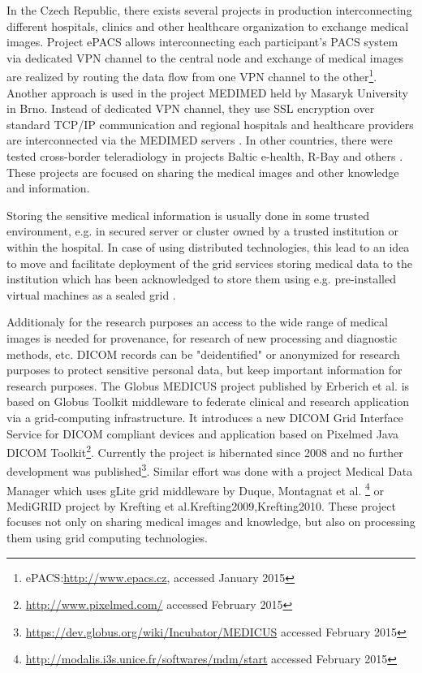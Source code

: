 In the Czech Republic, there exists several projects in production interconnecting different hospitals, clinics and other healthcare organization to exchange medical images. Project ePACS allows interconnecting each participant's PACS system via dedicated VPN channel to the central node and exchange of medical images are realized by routing the data flow from one VPN channel to the other\footnote{ePACS:\url{http://www.epacs.cz}, accessed January 2015}. Another approach is used in the project MEDIMED held by Masaryk University in Brno. Instead of dedicated VPN channel, they use  SSL encryption over standard TCP/IP communication and regional hospitals and healthcare providers are interconnected via the MEDIMED servers \cite{Slavicek2010,Zatloukal2012}.%
In other countries, there were tested cross-border teleradiology in projects Baltic e-health, R-Bay and others \cite{Ross2010,Saliba2012}.
These projects are focused on sharing the medical images and other knowledge and information.

Storing the sensitive medical information is usually done in some trusted environment, e.g. in secured server or cluster owned by a trusted institution or within the hospital. In case of using distributed technologies, this lead to an idea to move and facilitate deployment of the grid services storing medical data to the institution which has been acknowledged to store them using e.g. pre-installed virtual machines as a sealed grid \cite{Kuba2007a}.

Additionaly for the research purposes an access to the wide range of medical images is needed for provenance, for research of new processing and diagnostic methods, etc.  DICOM records can be "deidentified" or anonymized for research purposes to protect sensitive personal data, but keep important information for research purposes. The Globus MEDICUS project published by Erberich et al.\cite{Erberich2006,Erberich2007} is based on Globus Toolkit middleware to federate clinical and research application via a grid-computing infrastructure. It  introduces a new DICOM Grid Interface Service for DICOM compliant devices and application based on Pixelmed Java DICOM Toolkit\footnote{\url{http://www.pixelmed.com/} accessed February 2015}. Currently the project is hibernated since 2008 and no further development was published\footnote{\url{https://dev.globus.org/wiki/Incubator/MEDICUS} accessed February 2015}. Similar effort was done with a project Medical Data Manager which uses gLite grid middleware by Duque, Montagnat et al.\cite{Duque,Montagnat2007} \footnote{\url{http://modalis.i3s.unice.fr/softwares/mdm/start} accessed February 2015} or MediGRID project by Krefting et al.{Krefting2009,Krefting2010}. These project focuses not only on sharing medical images and knowledge, but also on processing them using grid computing technologies\cite{Krefting2010}.

